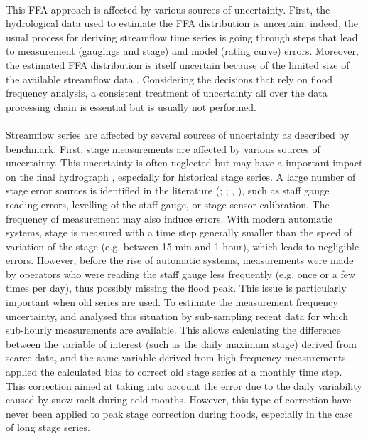 \documentclass[11pt]{article}
\begin{document}
    \paragraph{}
    This FFA approach is affected by various sources of uncertainty. First, the hydrological data used to estimate the FFA distribution is uncertain: indeed, the usual process for deriving streamflow time series is going through steps that lead to measurement (gaugings and stage) and model (rating curve) errors. Moreover, the estimated FFA distribution is itself uncertain because of the limited size of the available streamflow data \citep{kjeldsen_uncertainty_2011}. Considering the decisions that rely on flood frequency analysis, a consistent treatment of uncertainty all over the data processing chain is essential but is usually not performed.
    
    \paragraph{}
    Streamflow series are affected by several sources of uncertainty as described by \citet{mcmillan_benchmarking_2012} benchmark. First, stage measurements are affected by various sources of uncertainty. This uncertainty is often neglected but may have a important impact on the final hydrograph \citet{hamilton_quantifying_2012}, especially for historical stage series. A large number of stage error sources is identified in the literature (\citet{van_der_made_determination_1982}; \citet{petersen-overleir_uncertainty_2005}; \citet{mcmillan_benchmarking_2012}, \citet{horner_impact_2018}), such as staff gauge reading errors, levelling of the staff gauge, or stage sensor calibration. The frequency of measurement may also induce errors. With modern automatic systems, stage is measured with a time step generally smaller than the speed of variation of the stage (e.g. between 15 min and 1 hour), which leads to negligible errors. However, before the rise of automatic systems, measurements were made by operators who were reading the staff gauge less frequently (e.g. once or a few times per day), thus possibly missing the flood peak. This issue is particularly important when old series are used. To estimate the measurement frequency uncertainty, \citet{hamilton_quantifying_2012} and \citet{kuentz_hydrometrie_2014} analysed this situation by sub-sampling recent data for which sub-hourly measurements are available. This allows calculating the difference between the variable of interest (such as the daily maximum stage) derived from scarce data, and the same variable derived from high-frequency measurements. \citet{kuentz_hydrometrie_2014} applied the calculated bias to correct old stage series at a monthly time step. This correction aimed at taking into account the error due to the daily variability caused by snow melt during cold months. However, this type of correction have never been applied to peak stage correction during floods, especially in the case of long stage series.
    
\end{document}
